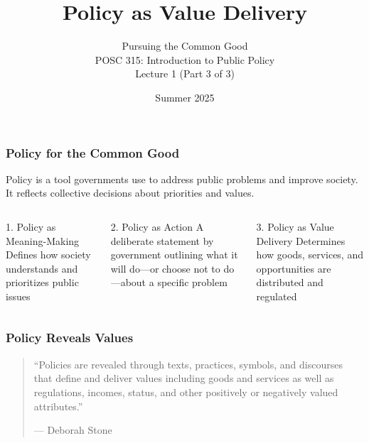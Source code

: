 \documentclass[10pt]{beamer}
\begin{document}
\title{Policy as Value Delivery}
\subtitle{Pursuing the Common Good\\POSC 315: Introduction to Public Policy\\Lecture 1 (Part 3 of 3)}
\date{Summer 2025}

\maketitle

\begin{frame}
\frametitle{Policy for the Common Good}

\begin{block}{}
Policy is a tool governments use to address public problems and improve society. It reflects collective decisions about priorities and values.
\end{block}

\vspace{0.5cm}

\begin{columns}
\begin{column}{0.32\textwidth}
\begin{block}{1. Policy as Meaning-Making}
\pause
Defines how society understands and prioritizes public issues
\end{block}
\end{column}

\begin{column}{0.32\textwidth}
\begin{block}{2. Policy as Action}
\pause
A deliberate statement by government outlining what it will do---or choose not to do---about a specific problem
\end{block}
\end{column}

\begin{column}{0.32\textwidth}
\begin{block}{3. Policy as Value Delivery}
\pause
Determines how goods, services, and opportunities are distributed and regulated
\end{block}
\end{column}
\end{columns}

\end{frame}

\begin{frame}
\frametitle{Policy Reveals Values}

\begin{quotation}
``Policies are revealed through texts, practices, symbols, and discourses that define and deliver values including goods and services as well as regulations, incomes, status, and other positively or negatively valued attributes.''

\vspace{0.5cm}
\hfill --- Deborah Stone
\end{quotation}

\end{frame}
\end{document}
